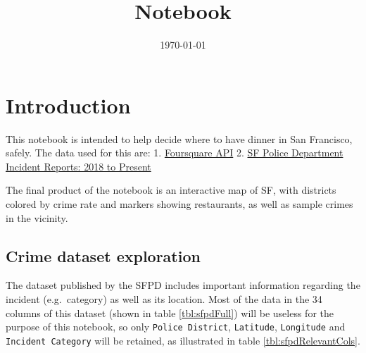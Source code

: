 \documentclass[10pt,parskip=half,
toc=sectionentrywithdots,
bibliography=totocnumbered,
captions=tableheading,numbers=noendperiod]{scrartcl}
\begin{document}
    \title{Notebook}
  \date{\today}
  \maketitle

    \begingroup
    \let\cleardoublepage\relax
    \let\clearpage\relax\tableofcontents
    \endgroup

\hypertarget{introduction}{%
\section{Introduction}\label{introduction}}

This notebook is intended to help decide where to have dinner in San
Francisco, safely. The data used for this are: 1.
\href{https://developer.foursquare.com/docs/api/venues/explore}{Foursquare
API} 2.
\href{https://data.sfgov.org/Public-Safety/Police-Department-Incident-Reports-2018-to-Present/wg3w-h783}{SF
Police Department Incident Reports: 2018 to Present}

The final product of the notebook is an interactive map of SF, with
districts colored by crime rate and markers showing restaurants, as well
as sample crimes in the vicinity.

\hypertarget{crime-dataset-exploration}{%
\subsection{Crime dataset exploration}\label{crime-dataset-exploration}}

The dataset published by the SFPD includes important information
regarding the incident (e.g.~category) as well as its location. Most of
the data in the 34 columns of this dataset (shown in table
\ref{tbl:sfpdFull}) will be useless for the purpose of this notebook, so
only \texttt{Police\ District}, \texttt{Latitude}, \texttt{Longitude}
and \texttt{Incident\ Category} will be retained, as illustrated in
table \ref{tbl:sfpdRelevantCols}.
\end{document}
